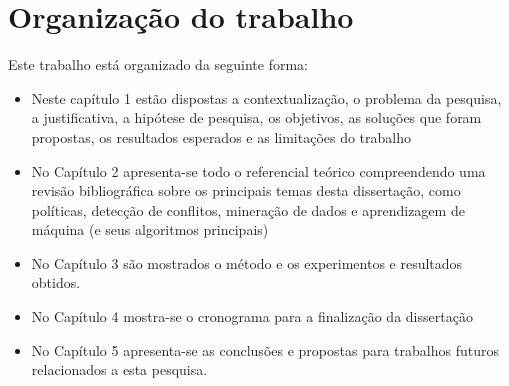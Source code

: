 \documentclass[
	12pt,				%
	openright,			%
	twoside,			%
	a4paper,			%
	english,			%
	french,				%
	spanish,			%
	brazil				%
	]{abntex2}
\begin{document}
\section{Organização do trabalho}
Este trabalho está organizado da seguinte forma:
\begin{itemize}
	\item Neste capítulo 1 estão dispostas a contextualização, o problema da pesquisa, a justificativa, a hipótese de pesquisa, os objetivos, as soluções que foram propostas, os resultados esperados e as limitações do trabalho
	\item No Capítulo 2 apresenta-se todo o referencial teórico compreendendo uma revisão bibliográfica sobre os principais temas desta dissertação, como políticas, detecção de conflitos, mineração de dados e aprendizagem de máquina (e seus algoritmos principais)
	\item No Capítulo 3 são mostrados o método e os experimentos e resultados obtidos.
	\item No Capítulo 4 mostra-se o cronograma para a finalização da dissertação
	\item No Capítulo 5 apresenta-se as conclusões e propostas para trabalhos futuros relacionados a esta pesquisa.
\end{itemize}
\clearpage

%
%

%
%
%
\end{document}
